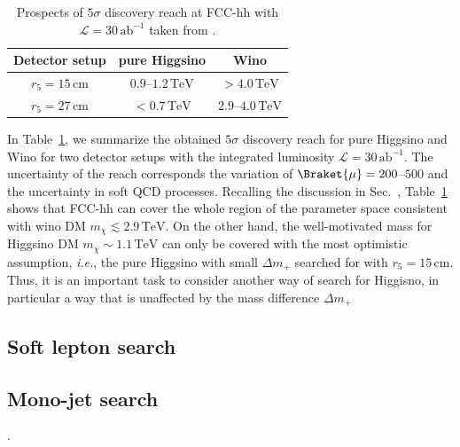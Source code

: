 \documentclass[12pt,twoside,book]{article}
\begin{document}
\begin{table}[t]
  \centering
  \begin{tabular}{c|cc}
    Detector setup & pure Higgsino & Wino \\ \hline
    $r_5 = 15\,\mathrm{cm}$ & $0.9$--$1.2\,\mathrm{TeV}$ & $> 4.0\,\mathrm{TeV}$ \\
    $r_5 = 27\,\mathrm{cm}$ & $<0.7\,\mathrm{TeV}$ & $2.9$--$4.0\,\mathrm{TeV}$
  \end{tabular}
  \caption{Prospects of $5\sigma$ discovery reach at FCC-hh with $\mathcal{L} = 30\,\mathrm{ab}^{-1}$ taken from \cite{Saito:2019rtg}.}
  \label{tab:disp_track_future}
\end{table}

In Table~\ref{tab:disp_track_future}, we summarize the obtained $5\sigma$ discovery reach for pure Higgsino and Wino for two detector setups with the integrated luminosity $\mathcal{L} = 30\,\mathrm{ab}^{-1}$.
The uncertainty of the reach corresponds the variation of $\Braket{\mu}=200$--$500$ and the uncertainty in soft QCD processes.
Recalling the discussion in Sec.~, Table~\ref{tab:disp_track_future} shows that FCC-hh can cover the whole region of the parameter space consistent with wino DM $m_\chi \lesssim 2.9\,\mathrm{TeV}$.
On the other hand, the well-motivated mass for Higgsino DM $m_\chi \sim 1.1\,\mathrm{TeV}$ can only be covered with the most optimistic assumption, \textit{i.e.}, the pure Higgsino with small $\Delta m_{+}$ searched for with $r_5 = 15\,\mathrm{cm}$.
Thus, it is an important task to consider another way of search for Higgisno, in particular a way that is unaffected by the mass difference $\Delta m_{+}$



\subsection{Soft lepton search}
\label{sec:soft_lepton}



\subsection{Mono-jet search}
\label{sec:mono-jet}

 \cite{Baer:2014cua}.


% 
% 
\end{document}

